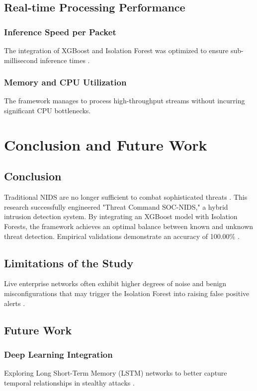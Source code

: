 \documentclass[12pt, a4paper]{report}
\begin{document}
\section{Real-time Processing Performance}
\subsection{Inference Speed per Packet}
The integration of XGBoost and Isolation Forest was optimized to ensure sub-millisecond inference times \cite{ref3}.
\subsection{Memory and CPU Utilization}
The framework manages to process high-throughput streams without incurring significant CPU bottlenecks.

\chapter{Conclusion and Future Work}
\section{Conclusion}
Traditional NIDS are no longer sufficient to combat sophisticated threats \cite{ref4}. This research successfully engineered "Threat Command SOC-NIDS," a hybrid intrusion detection system. By integrating an XGBoost model with Isolation Forests, the framework achieves an optimal balance between known and unknown threat detection. Empirical validations demonstrate an accuracy of 100.00\% \cite{ref5}. 

\section{Limitations of the Study}
Live enterprise networks often exhibit higher degrees of noise and benign misconfigurations that may trigger the Isolation Forest into raising false positive alerts \cite{ref7}. 

\section{Future Work}
\subsection{Deep Learning Integration}
Exploring Long Short-Term Memory (LSTM) networks to better capture temporal relationships in stealthy attacks \cite{ref8}.
\end{document}
